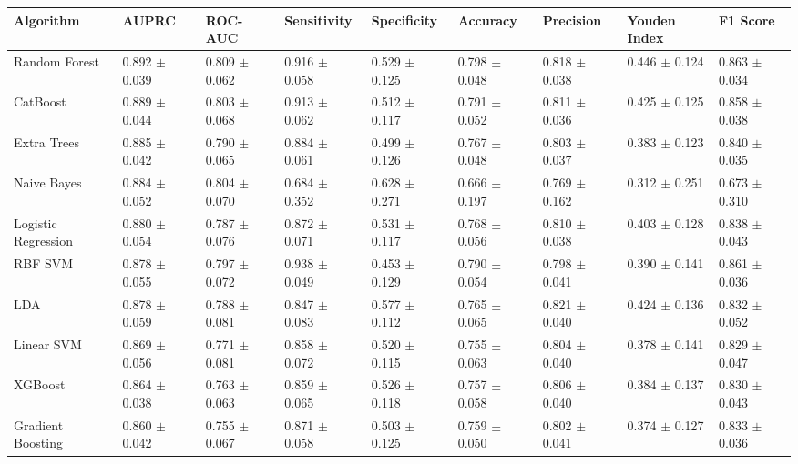 \documentclass[pdflatex,sn-mathphys-num]{sn-jnl}%
\theoremstyle{thmstyleone}%
\theoremstyle{thmstyletwo}%
\theoremstyle{thmstylethree}%
\begin{document}
\begin{appendices}
\begin{table}
    \centering
    \footnotesize
    \setlength{\tabcolsep}{4pt}
    \begin{tabular}{lllllllll}
        \toprule
        Algorithm & AUPRC & ROC-AUC & Sensitivity & Specificity & Accuracy & Precision & Youden Index & F1 Score \\
        \midrule
        Random Forest & 0.892 $\pm$ 0.039 & 0.809 $\pm$ 0.062 & 0.916 $\pm$ 0.058 & 0.529 $\pm$ 0.125 & 0.798 $\pm$ 0.048 & 0.818 $\pm$ 0.038 & 0.446 $\pm$ 0.124 & 0.863 $\pm$ 0.034 \\
        CatBoost & 0.889 $\pm$ 0.044 & 0.803 $\pm$ 0.068 & 0.913 $\pm$ 0.062 & 0.512 $\pm$ 0.117 & 0.791 $\pm$ 0.052 & 0.811 $\pm$ 0.036 & 0.425 $\pm$ 0.125 & 0.858 $\pm$ 0.038 \\
        Extra Trees & 0.885 $\pm$ 0.042 & 0.790 $\pm$ 0.065 & 0.884 $\pm$ 0.061 & 0.499 $\pm$ 0.126 & 0.767 $\pm$ 0.048 & 0.803 $\pm$ 0.037 & 0.383 $\pm$ 0.123 & 0.840 $\pm$ 0.035 \\
        Naive Bayes & 0.884 $\pm$ 0.052 & 0.804 $\pm$ 0.070 & 0.684 $\pm$ 0.352 & 0.628 $\pm$ 0.271 & 0.666 $\pm$ 0.197 & 0.769 $\pm$ 0.162 & 0.312 $\pm$ 0.251 & 0.673 $\pm$ 0.310 \\
        Logistic Regression & 0.880 $\pm$ 0.054 & 0.787 $\pm$ 0.076 & 0.872 $\pm$ 0.071 & 0.531 $\pm$ 0.117 & 0.768 $\pm$ 0.056 & 0.810 $\pm$ 0.038 & 0.403 $\pm$ 0.128 & 0.838 $\pm$ 0.043 \\
        RBF SVM & 0.878 $\pm$ 0.055 & 0.797 $\pm$ 0.072 & 0.938 $\pm$ 0.049 & 0.453 $\pm$ 0.129 & 0.790 $\pm$ 0.054 & 0.798 $\pm$ 0.041 & 0.390 $\pm$ 0.141 & 0.861 $\pm$ 0.036 \\
        LDA & 0.878 $\pm$ 0.059 & 0.788 $\pm$ 0.081 & 0.847 $\pm$ 0.083 & 0.577 $\pm$ 0.112 & 0.765 $\pm$ 0.065 & 0.821 $\pm$ 0.040 & 0.424 $\pm$ 0.136 & 0.832 $\pm$ 0.052 \\
        Linear SVM & 0.869 $\pm$ 0.056 & 0.771 $\pm$ 0.081 & 0.858 $\pm$ 0.072 & 0.520 $\pm$ 0.115 & 0.755 $\pm$ 0.063 & 0.804 $\pm$ 0.040 & 0.378 $\pm$ 0.141 & 0.829 $\pm$ 0.047 \\
        XGBoost & 0.864 $\pm$ 0.038 & 0.763 $\pm$ 0.063 & 0.859 $\pm$ 0.065 & 0.526 $\pm$ 0.118 & 0.757 $\pm$ 0.058 & 0.806 $\pm$ 0.040 & 0.384 $\pm$ 0.137 & 0.830 $\pm$ 0.043 \\
        Gradient Boosting & 0.860 $\pm$ 0.042 & 0.755 $\pm$ 0.067 & 0.871 $\pm$ 0.058 & 0.503 $\pm$ 0.125 & 0.759 $\pm$ 0.050 & 0.802 $\pm$ 0.041 & 0.374 $\pm$ 0.127 & 0.833 $\pm$ 0.036 \\

\end{tabular}
\end{table}
\end{appendices}
\end{document}
